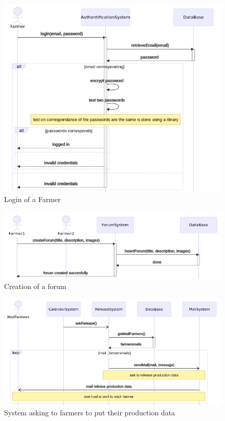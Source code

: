 \begin{figure} [!h]
	\centering
	\includegraphics[width=\textwidth]{Images/seq_login.png}
	\caption{\label{fig:seq_login} Login of a Farmer}
\end{figure}

\begin{figure} [!h]
	\centering
	\includegraphics[width=\textwidth]{Images/seq_forum_creation.png}
	\caption{\label{fig:seq_crea_forum} Creation of a forum}
\end{figure}

\begin{figure} [!h]
	\centering
	\includegraphics[width=\textwidth]{Images/seq_asking_prod_data.png}
	\caption{\label{fig:seq_asking_proddata} System asking to farmers to put their production data}
\end{figure}

